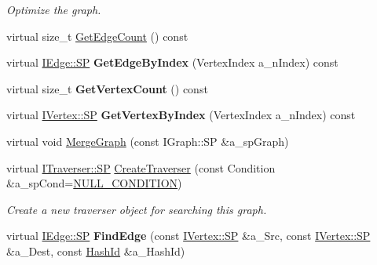 \begin{DoxyCompactItemize}
\begin{DoxyCompactList}\small\item\em Optimize the graph. \end{DoxyCompactList}\item 
virtual size\+\_\+t \hyperlink{class_graph_self_aa1514f3883bef6d823bd56d91a565b9c}{Get\+Edge\+Count} () const
\item 
\mbox{\label{class_graph_self_a4fa48390a299f7e0453d7557e8a094c9}} 
virtual \hyperlink{class_i_graph_1_1_i_edge_adfae3ec3e377543685a06b9c5d5a776a}{I\+Edge\+::\+SP} {\bfseries Get\+Edge\+By\+Index} (Vertex\+Index a\+\_\+n\+Index) const
\item 
\mbox{\label{class_graph_self_a604f142168d4ae906649956a385c06d1}} 
virtual size\+\_\+t {\bfseries Get\+Vertex\+Count} () const
\item 
\mbox{\label{class_graph_self_aa8315c3e17031778264e97ca4795825a}} 
virtual \hyperlink{class_i_graph_1_1_i_vertex_af72b9df91f110bc7824c608c10cc819c}{I\+Vertex\+::\+SP} {\bfseries Get\+Vertex\+By\+Index} (Vertex\+Index a\+\_\+n\+Index) const
\item 
virtual void \hyperlink{class_graph_self_a64103889965233bb574b55bf2b7b1188}{Merge\+Graph} (const I\+Graph\+::\+SP \&a\+\_\+sp\+Graph)
\item 
\mbox{\label{class_graph_self_a405b9a94515464cc4f48d1e7d9952f98}} 
virtual \hyperlink{class_i_graph_1_1_i_traverser_a5a5ccc81423d6024742d1898a310d812}{I\+Traverser\+::\+SP} \hyperlink{class_graph_self_a405b9a94515464cc4f48d1e7d9952f98}{Create\+Traverser} (const Condition \&a\+\_\+sp\+Cond=\hyperlink{class_i_graph_af5f1100a2f9d5a6f7e795bd7b2d642a4}{N\+U\+L\+L\+\_\+\+C\+O\+N\+D\+I\+T\+I\+ON})
\begin{DoxyCompactList}\small\item\em Create a new traverser object for searching this graph. \end{DoxyCompactList}\item 
\mbox{\label{class_graph_self_a31d2e85031fa61743379938a17209ce6}} 
virtual \hyperlink{class_i_graph_1_1_i_edge_adfae3ec3e377543685a06b9c5d5a776a}{I\+Edge\+::\+SP} {\bfseries Find\+Edge} (const \hyperlink{class_i_graph_1_1_i_vertex_af72b9df91f110bc7824c608c10cc819c}{I\+Vertex\+::\+SP} \&a\+\_\+\+Src, const \hyperlink{class_i_graph_1_1_i_vertex_af72b9df91f110bc7824c608c10cc819c}{I\+Vertex\+::\+SP} \&a\+\_\+\+Dest, const \hyperlink{class_i_graph_a27d53eee7b0a7abc9fce6c28983d5446}{Hash\+Id} \&a\+\_\+\+Hash\+Id)

\end{DoxyCompactItemize}
